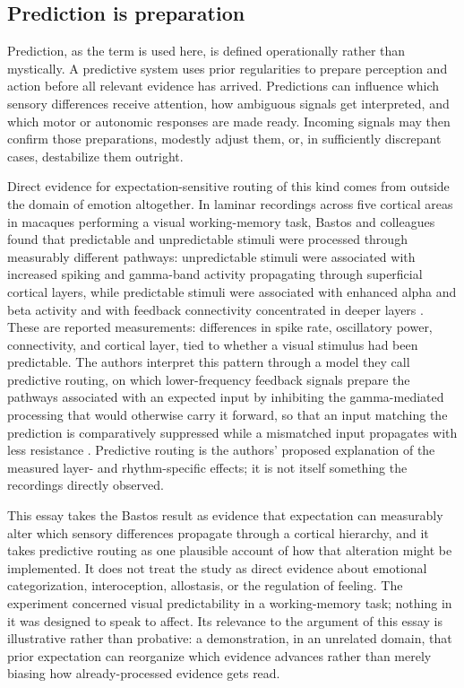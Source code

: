\documentclass[11pt]{article}
\begin{document}
\subsection{Prediction is preparation}

Prediction, as the term is used here, is defined operationally rather than mystically. A predictive system uses prior regularities to prepare perception and action before all relevant evidence has arrived. Predictions can influence which sensory differences receive attention, how ambiguous signals get interpreted, and which motor or autonomic responses are made ready. Incoming signals may then confirm those preparations, modestly adjust them, or, in sufficiently discrepant cases, destabilize them outright.

Direct evidence for expectation-sensitive routing of this kind comes from outside the domain of emotion altogether. In laminar recordings across five cortical areas in macaques performing a visual working-memory task, Bastos and colleagues found that predictable and unpredictable stimuli were processed through measurably different pathways: unpredictable stimuli were associated with increased spiking and gamma-band activity propagating through superficial cortical layers, while predictable stimuli were associated with enhanced alpha and beta activity and with feedback connectivity concentrated in deeper layers \citep{Bastos2020}. These are reported measurements: differences in spike rate, oscillatory power, connectivity, and cortical layer, tied to whether a visual stimulus had been predictable. The authors interpret this pattern through a model they call predictive routing, on which lower-frequency feedback signals prepare the pathways associated with an expected input by inhibiting the gamma-mediated processing that would otherwise carry it forward, so that an input matching the prediction is comparatively suppressed while a mismatched input propagates with less resistance \citep{Bastos2020}. Predictive routing is the authors' proposed explanation of the measured layer- and rhythm-specific effects; it is not itself something the recordings directly observed.

This essay takes the Bastos result as evidence that expectation can measurably alter which sensory differences propagate through a cortical hierarchy, and it takes predictive routing as one plausible account of how that alteration might be implemented. It does not treat the study as direct evidence about emotional categorization, interoception, allostasis, or the regulation of feeling. The experiment concerned visual predictability in a working-memory task; nothing in it was designed to speak to affect. Its relevance to the argument of this essay is illustrative rather than probative: a demonstration, in an unrelated domain, that prior expectation can reorganize which evidence advances rather than merely biasing how already-processed evidence gets read.
\end{document}
